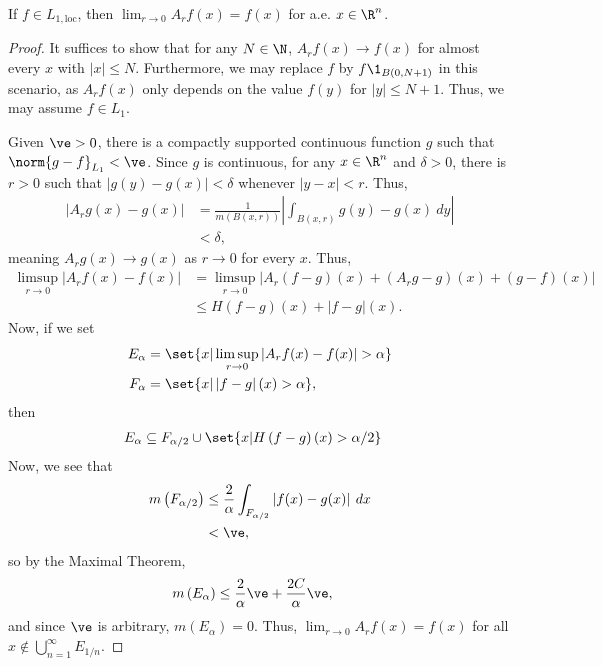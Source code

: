 \documentclass[10pt]{mypackage}
\begin{document}
\begin{theorem}
  If $f\in L_{1,\text{loc}}$, then $\lim_{r\rightarrow 0}A_rf(x) = f(x)$ for a.e. $x\in \R^n$.
\end{theorem}
\begin{proof}
  It suffices to show that for any $N\in \N$, $A_rf(x) \rightarrow f(x)$ for almost every $x$ with $\left\vert x \right\vert \leq N$. Furthermore, we may replace $f$ by $f\1_{B\left( 0,N+1 \right)}$ in this scenario, as $A_rf(x)$ only depends on the value $f(y)$ for $\left\vert y \right\vert \leq N+1$. Thus, we may assume $f\in L_1$.\newline

  Given $\ve > 0$, there is a compactly supported continuous function $g$ such that $\norm{g-f}_{L_1} < \ve$. Since $g$ is continuous, for any $x\in \R^n$ and $\delta > 0$, there is $r > 0$ such that $\left\vert g(y)-g(x) \right\vert < \delta$ whenever $\left\vert y-x \right\vert < r$. Thus,
  \begin{align*}
    \left\vert A_rg(x) - g(x) \right\vert &= \frac{1}{m\left( B\left( x,r \right) \right)} \left\vert \int_{B\left( x,r \right)}^{} g(y)-g(x)\:dy \right\vert\\
                                          &< \delta,
  \end{align*}
  meaning $A_rg(x) \rightarrow g(x)$ as $r\rightarrow 0$ for every $x$. Thus,
  \begin{align*}
    \limsup_{r\rightarrow 0} \left\vert A_rf(x) - f(x) \right\vert &= \limsup_{r\rightarrow 0} \left\vert A_r\left( f-g \right)(x) + \left( A_rg-g \right)(x) + \left( g-f \right)(x) \right\vert\\
                                                                   &\leq H\left( f-g \right)(x) + \left\vert f-g \right\vert(x).
  \end{align*}
  Now, if we set
  \begin{align*}
    E_{\alpha} &= \set{x | \limsup_{r\rightarrow 0}\left\vert A_rf(x) - f(x) \right\vert > \alpha}\\
    F_{\alpha} &= \set{x | \left\vert f-g \right\vert(x) > \alpha},
  \end{align*}
  then
  \begin{align*}
    E_{\alpha} &\subseteq F_{\alpha/2} \cup \set{x | H\left( f-g \right)(x) > \alpha/2}
  \end{align*}
  Now, we see that
  \begin{align*}
    m\left( F_{\alpha/2} \right) &\leq \frac{2}{\alpha} \int_{F_{\alpha/2}}^{} \left\vert f(x)-g(x) \right\vert\:dx\\
                                 &< \ve,
  \end{align*}
  so by the Maximal Theorem,
  \begin{align*}
    m\left( E_{\alpha} \right) &\leq \frac{2}{\alpha} \ve + \frac{2C}{\alpha} \ve,
  \end{align*}
  and since $\ve$ is arbitrary, $m\left( E_{\alpha} \right) = 0$. Thus, $\lim_{r\rightarrow 0}A_rf(x) = f(x)$ for all $x\notin \bigcup_{n=1}^{\infty}E_{1/n}$.\newline


\end{proof}
\end{document}
